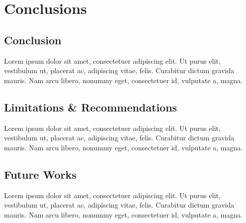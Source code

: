 \chapter{Conclusions}

\section{Conclusion}

Lorem ipsum dolor sit amet, consectetuer adipiscing elit. Ut purus elit, vestibulum
ut, placerat ac, adipiscing vitae, felis. Curabitur dictum gravida mauris. Nam arcu libero, nonummy eget, consectetuer id, vulputate a, magna. 

\section{Limitations \& Recommendations}

Lorem ipsum dolor sit amet, consectetuer adipiscing elit. Ut purus elit, vestibulum
ut, placerat ac, adipiscing vitae, felis. Curabitur dictum gravida mauris. Nam arcu libero, nonummy eget, consectetuer id, vulputate a, magna. 

\section{Future Works}

Lorem ipsum dolor sit amet, consectetuer adipiscing elit. Ut purus elit, vestibulum
ut, placerat ac, adipiscing vitae, felis. Curabitur dictum gravida mauris. Nam arcu libero, nonummy eget, consectetuer id, vulputate a, magna. 